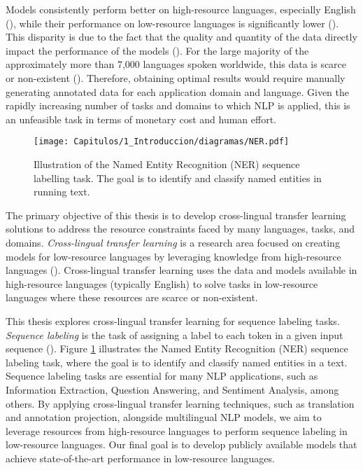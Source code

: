 Models consistently perform better on high-resource languages, especially English (\cite{etxaniz-etal-2024-multilingual}), while their performance on low-resource languages is significantly lower (\cite{DBLP:journals/corr/abs-2311-07978, DBLP:conf/africanlp/OjoO23}). This disparity is due to the fact that the quality and quantity of the data directly impact the performance of the models (\cite{DBLP:conf/aaai/Liu0YDJCMF21}). For the large majority of the approximately more than 7,000 languages spoken worldwide, this data is scarce or non-existent (\cite{joshi-etal-2020-state}). Therefore, obtaining optimal results would require manually generating annotated data for each application domain and language. Given the rapidly increasing number of tasks and domains to which NLP is applied, this is an unfeasible task in terms of monetary cost and human effort.

\begin{figure}[htb]
    \centering
    \texttt{[image: Capitulos/1\_Introduccion/diagramas/NER.pdf]}
    \caption{Illustration of the Named Entity Recognition (NER) sequence labelling task. The goal is to identify and classify named entities in running text.}
    \label{fig1:Ner}
\end{figure}

The primary objective of this thesis is to develop cross-lingual transfer learning solutions to address the resource constraints faced by many languages, tasks, and domains. \emph{Cross-lingual transfer learning} is a research area focused on creating models for low-resource languages by leveraging knowledge from high-resource languages (\cite{DBLP:conf/nips/ConneauL19}). Cross-lingual transfer learning uses the data and models available in high-resource languages (typically English) to solve tasks in low-resource languages where these resources are scarce or non-existent.

This thesis explores cross-lingual transfer learning for sequence labeling tasks. \emph{Sequence labeling} is the task of assigning a label to each token in a given input sequence (\cite{DBLP:conf/icml/LaffertyMP01}). Figure \ref{fig1:Ner} illustrates the Named Entity Recognition (NER) sequence labeling task, where the goal is to identify and classify named entities in a text. Sequence labeling tasks are essential for many NLP applications, such as Information Extraction, Question Answering, and Sentiment Analysis, among others. By applying cross-lingual transfer learning techniques, such as translation and annotation projection, alongside multilingual NLP models, we aim to leverage resources from high-resource languages to perform sequence labeling in low-resource languages. Our final goal is to develop publicly available models that achieve state-of-the-art performance in low-resource languages. 


